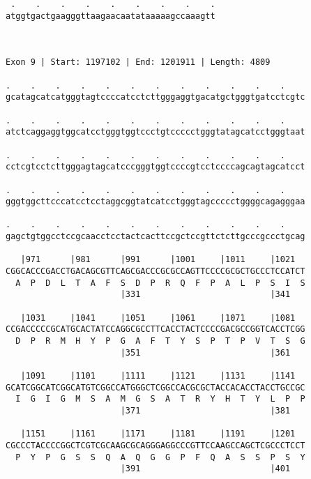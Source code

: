 \documentclass{article}
\begin{document}
\begin{Verbatim}
 .    .    .    .    .    .    .    .    .
atggtgactgaagggttaagaacaatataaaaagccaaagtt
                                          
                                          
 
Exon 9 | Start: 1197102 | End: 1201911 | Length: 4809
 
.    .    .    .    .    .    .    .    .    .    .    .    
gcatagcatcatgggtagtccccatcctcttgggaggtgacatgctgggtgatcctcgtc
                                                            
.    .    .    .    .    .    .    .    .    .    .    .    
atctcaggaggtggcatcctgggtggtccctgtccccctgggtatagcatcctgggtaat
                                                            
.    .    .    .    .    .    .    .    .    .    .    .    
cctcgtcctcttgggagtagcatcccgggtggtccccgtcctccccagcagtagcatcct
                                                            
.    .    .    .    .    .    .    .    .    .    .    .    
gggtggcttcccatcctcctaggcggtatcatcctgggtagccccctggggcagagggaa
                                                            
.    .    .    .    .    .    .    .    .    .    .    .    
gagctgtggcctccgcaacctcctactcacttccgctccgttctcttgcccgccctgcag
                                                            
   |971      |981      |991      |1001     |1011     |1021  
CGGCACCCGACCTGACAGCGTTCAGCGACCCGCGCCAGTTCCCCGCGCTGCCCTCCATCT
  A  P  D  L  T  A  F  S  D  P  R  Q  F  P  A  L  P  S  I  S
                       |331                          |341   
  
   |1031     |1041     |1051     |1061     |1071     |1081  
CCGACCCCCGCATGCACTATCCAGGCGCCTTCACCTACTCCCCGACGCCGGTCACCTCGG
  D  P  R  M  H  Y  P  G  A  F  T  Y  S  P  T  P  V  T  S  G
                       |351                          |361   
  
   |1091     |1101     |1111     |1121     |1131     |1141  
GCATCGGCATCGGCATGTCGGCCATGGGCTCGGCCACGCGCTACCACACCTACCTGCCGC
  I  G  I  G  M  S  A  M  G  S  A  T  R  Y  H  T  Y  L  P  P
                       |371                          |381   
  
   |1151     |1161     |1171     |1181     |1191     |1201  
CGCCCTACCCCGGCTCGTCGCAAGCGCAGGGAGGCCCGTTCCAAGCCAGCTCGCCCTCCT
  P  Y  P  G  S  S  Q  A  Q  G  G  P  F  Q  A  S  S  P  S  Y
                       |391                          |401   
  

\end{Verbatim}
\end{document}
